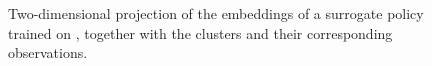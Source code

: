 \begin{figure}[t]
    \caption[Two-dimensional projection of a latent space for \SpaceInvadersName.]{Two-dimensional projection of the  embeddings of a surrogate policy trained on \SpaceInvadersName, together with the  clusters and their corresponding observations.}
    \label{fig:space_invaders_projection}
\end{figure}
